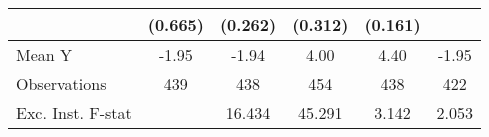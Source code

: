 {\begin{tabular}{l*{5}{c}}
            &     (0.665)         &     (0.262)         &     (0.312)         &     (0.161)         &                     \\
\midrule
Mean Y      &       -1.95         &       -1.94         &        4.00         &        4.40         &       -1.95         \\
Observations&         439         &         438         &         454         &         438         &         422         \\
Exc. Inst. F-stat&                     &      16.434         &      45.291         &       3.142         &       2.053         \\
\bottomrule
\end{tabular}
}
